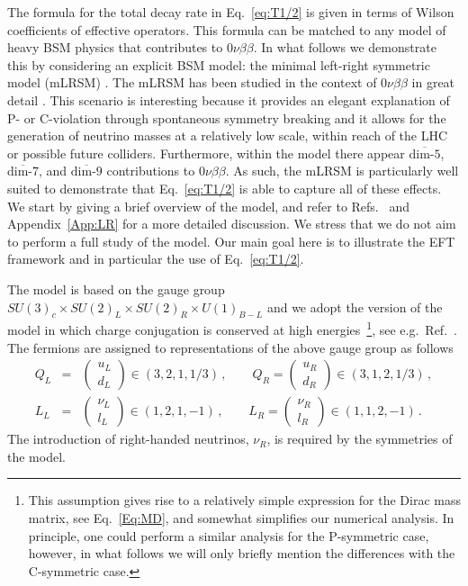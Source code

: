 \documentclass[letterpaper,11pt]{article}
\newcommand{\bea}{\begin{eqnarray}}
\newcommand{\eea}{\end{eqnarray}}
\newcommand{\bma}{\begin{pmatrix}}
\newcommand{\ema}{\end{pmatrix}}
\newcommand{\nn}{\nonumber}
\newcommand{\textoverline}[1]{$\overline{\mbox{#1}}$}
\begin{document}
The formula for the total decay rate in Eq.~\eqref{eq:T1/2} is given in terms of Wilson coefficients of effective operators. This formula can be matched to any model of heavy BSM physics that contributes to $0\nu\beta\beta$. In what follows we demonstrate this by considering an explicit BSM model: the minimal left-right symmetric model (mLRSM) \cite{Pati:1974yy, Mohapatra:1974hk, Senjanovic:1975rk}. The mLRSM has been studied in the context of $0\nu\beta\beta$ in great detail \cite{Prezeau:2003xn,Bambhaniya:2015ipg,Dev:2014xea,Tello:2010am,Nemevsek:2011aa,Barry:2013xxa}.  
This scenario is interesting because 
it provides an elegant explanation of P- or C-violation through spontaneous symmetry breaking and 
it allows for the generation of neutrino masses at a relatively low scale,  within reach of the LHC or possible future colliders. Furthermore, within the model there appear \textoverline{dim-5}, \textoverline{dim-7}, and \textoverline{dim-9} contributions to $0\nu\beta\beta$. As such, the mLRSM is particularly well suited to demonstrate that Eq.~\eqref{eq:T1/2} is able to capture all of these effects. 
We start by giving a brief overview of the model, and refer to Refs.~\cite{Pati:1974yy, Mohapatra:1974hk,Senjanovic:1975rk,Senjanovic:1978ev, Mohapatra:1986uf} and Appendix~\ref{App:LR} for a more detailed discussion. We stress that we do not aim to perform a full study of the model. Our main goal here is to illustrate   the EFT framework and in particular the use of  Eq.~\eqref{eq:T1/2}.

The model is based on the gauge group  $SU(3)_c\times SU(2)_L \times SU(2)_R \times U(1)_{B-L}$ and we adopt the version of the model in which charge conjugation is conserved at high energies~\footnote{This assumption gives rise to a relatively simple expression for the Dirac mass matrix, see Eq.\ \eqref{Eq:MD}, and somewhat simplifies our numerical analysis.  In principle, one could perform a similar analysis for the P-symmetric case, however, in what follows we will only briefly mention the differences with the C-symmetric case.}, see e.g.\ Ref.\ \cite{Maiezza:2010ic}. 
The fermions are assigned to representations of the above gauge group as follows
\bea 
Q_L &=&\bma u_L\\d_L\ema \in (3,2,1,1/3)\,, \qquad Q_R = \bma u_R\\d_R\ema\in (3,1,2,1/3)\,,\nn\\
L_L &=&\bma \nu_L\\l_L\ema \in (1,2,1,-1)\,, \qquad L_R = \bma \nu_R\\l_R\ema\in (1,1,2,-1)\,.
\eea
The introduction of  right-handed neutrinos, $\nu_R$, is required by the symmetries of the model.
\end{document}
